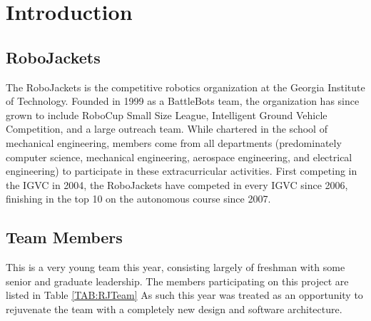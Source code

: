 \section{Introduction}

\subsection{RoboJackets}

The RoboJackets is the competitive robotics organization at the Georgia Institute of Technology. Founded in 1999 as a BattleBots team, the organization has since grown to include RoboCup Small Size League, Intelligent Ground Vehicle Competition, and a large outreach team. While chartered in the school of mechanical engineering, members come from all departments (predominately computer science, mechanical engineering, aerospace engineering, and electrical engineering) to participate in these extracurricular activities. First competing in the IGVC in 2004, the RoboJackets have competed in every IGVC since 2006, finishing in the top 10 on the autonomous course since 2007.

\subsection{Team Members}

This is a very young team this year, consisting largely of freshman with some senior and graduate leadership. The members participating on this project are listed in Table \ref{TAB:RJTeam} As such this year was treated as an opportunity to rejuvenate the team with a completely new design and software architecture.

